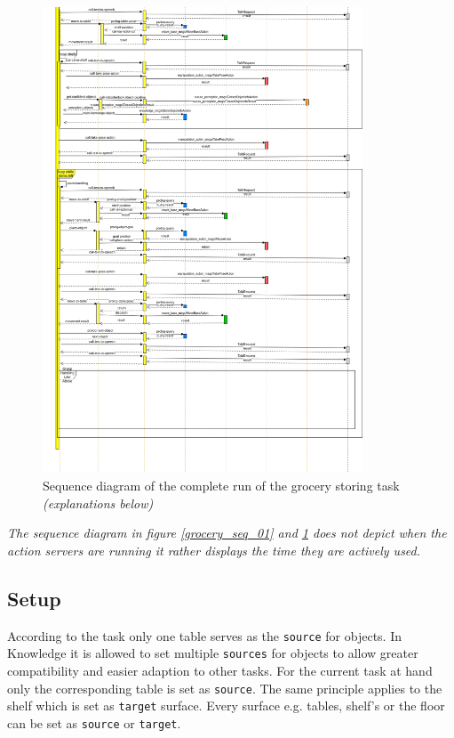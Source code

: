 \documentclass[main.tex]{subfiles}
\begin{document}
		\begin{figure}[H]
			\centering
			\includegraphics[width=0.85\textwidth]{pictures/diagramms/second-part-grocery-sequence.png}
			\caption{Sequence diagram of the complete run of the grocery storing task \textit{(explanations below)}}
			\label{grocery_seq_02}
		\end{figure}
		\textit{The sequence diagram in figure \ref{grocery_seq_01} and \ref{grocery_seq_02} does not depict when the action servers are running it rather displays the time they are actively used.}
	
	\subsection{Setup}
	

	\begin{knowledge}
	According to the task only one table serves as the \texttt{source} for objects. In Knowledge it is allowed to set multiple \texttt{sources} for objects to allow greater compatibility and easier adaption to other tasks. For the current task at hand only the corresponding table is set as \texttt{source}. The same principle applies to the shelf which is set as \texttt{target} surface. Every surface e.g. tables, shelf's or the floor can be set as \texttt{source} or \texttt{target}.
	\end{knowledge}
	
\end{document}

